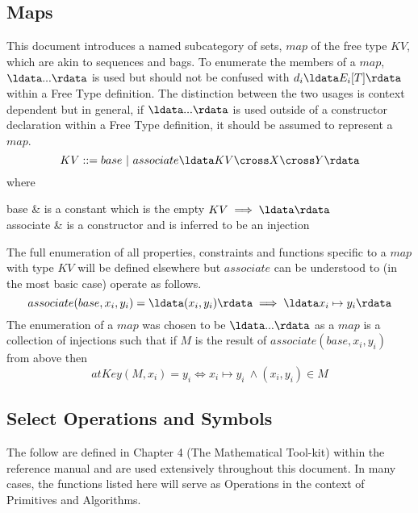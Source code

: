 \documentclass[../main.tex]{subfiles}
\begin{document}
\subsection{Maps}
This document introduces a named subcategory of sets, $map$ of the free type $KV$,
which are akin to sequences and bags. To enumerate the members of a $map$, $\ldata ... \rdata$ is used
but should not be confused with $d_{i}\ldata E_{i}[T]\rdata$ within a Free Type definition. The
distinction between the two usages is context dependent but in general, if $\ldata ... \rdata$
is used outside of a constructor declaration within a Free Type definition,
it should be assumed to represent a $map$.
$$KV ::= base ~| ~associate\ldata KV \cross X \cross Y \rdata$$
where
\begin{argue}
  base & is a constant which is the empty $KV \implies \ldata \rdata$ \\
  associate & is a constructor and is inferred to be an injection
\end{argue}
The full enumeration of all properties, constraints and functions
specific to a $map$ with type $KV$ will be defined elsewhere but
$associate$ can be understood to (in the most basic case) operate as follows.
$$associate(base, x_{i}, y_{i}) = \ldata (x_{i}, y_{i}) \rdata \implies \ldata x_{i} \mapsto y_{i} \rdata$$
The enumeration of a $map$ was chosen to be $\ldata ... \rdata$ as a $map$ is a collection of injections
such that if $M$ is the result of $associate(base, x_{i}, y_{i})$ from above then
$$atKey(M, x_{i}) = y_{i} \iff x_{i} \mapsto y_{i} ~\land (x_{i}, y_{i}) \in M$$

\subsection{Select Operations and Symbols}
The follow are defined in Chapter 4 (The Mathematical Tool-kit) within the reference manual
and are used extensively throughout this document. In many cases, the functions listed here
will serve as Operations in the context of Primitives and Algorithms.
\end{document}
